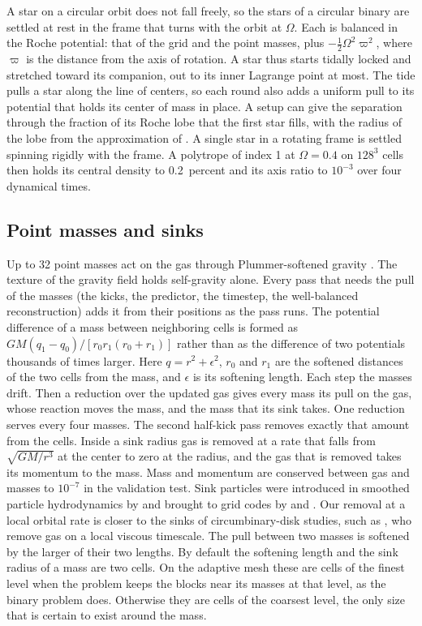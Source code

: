 \documentclass[twocolumn]{aastex701}
\begin{document}
A star on a circular orbit does not fall freely, so the stars of a circular binary are settled at rest in the frame that turns with the orbit at $\Omega$. Each is balanced in the Roche potential: that of the grid and the point masses, plus $-\tfrac12\Omega^2\varpi^2$, where $\varpi$ is the distance from the axis of rotation. A star thus starts tidally locked and stretched toward its companion, out to its inner Lagrange point at most. The tide pulls a star along the line of centers, so each round also adds a uniform pull to its potential that holds its center of mass in place. A setup can give the separation through the fraction of its Roche lobe that the first star fills, with the radius of the lobe from the approximation of \citet{Eggleton1983}. A single star in a rotating frame is settled spinning rigidly with the frame. A polytrope of index 1 at $\Omega = 0.4$ on $128^3$ cells then holds its central density to 0.2~percent and its axis ratio to $10^{-3}$ over four dynamical times.

\subsection{Point masses and sinks}
\label{sec:sinks}

Up to 32 point masses act on the gas through Plummer-softened gravity \citep{Plummer1911}. The texture of the gravity field holds self-gravity alone. Every pass that needs the pull of the masses (the kicks, the predictor, the timestep, the well-balanced reconstruction) adds it from their positions as the pass runs. The potential difference of a mass between neighboring cells is formed as $GM(q_1 - q_0)/[r_0 r_1 (r_0 + r_1)]$ rather than as the difference of two potentials thousands of times larger. Here $q = r^2 + \epsilon^2$, $r_0$ and $r_1$ are the softened distances of the two cells from the mass, and $\epsilon$ is its softening length. Each step the masses drift. Then a reduction over the updated gas gives every mass its pull on the gas, whose reaction moves the mass, and the mass that its sink takes. One reduction serves every four masses. The second half-kick pass removes exactly that amount from the cells. Inside a sink radius gas is removed at a rate that falls from $\sqrt{GM/r^3}$ at the center to zero at the radius, and the gas that is removed takes its momentum to the mass. Mass and momentum are conserved between gas and masses to $10^{-7}$ in the validation test. Sink particles were introduced in smoothed particle hydrodynamics by \citet{Bate1995} and brought to grid codes by \citet{Krumholz2004} and \citet{Federrath2010}. Our removal at a local orbital rate is closer to the sinks of circumbinary-disk studies, such as \citet{Farris2014}, who remove gas on a local viscous timescale. The pull between two masses is softened by the larger of their two lengths. By default the softening length and the sink radius of a mass are two cells. On the adaptive mesh these are cells of the finest level when the problem keeps the blocks near its masses at that level, as the binary problem does. Otherwise they are cells of the coarsest level, the only size that is certain to exist around the mass.
\end{document}

